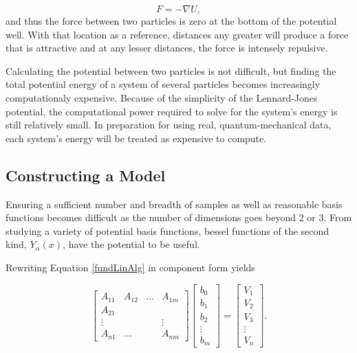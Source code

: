 \begin{equation} \label{forceEq}
F = -\nabla U,
\end{equation}
and thus the force between two particles is zero at the bottom of the potential well. With that location as a reference, distances any greater will produce a force that is attractive and at any lesser distances, the force is intensely repulsive.
\par Calculating the potential between two particles is not difficult, but finding the total potential energy of a system of several particles becomes increasingly computationaly expensive. Because of the simplicity of the Lennard-Jones potential, the computational power required to solve for the system's energy is still relatively small. In preparation for using real, quantum-mechanical data, each system's energy will be treated as expensive to compute. 



\subsection{Constructing a Model}\label{Sect:LJModels}
\par Ensuring a sufficient number and breadth of samples as well as reasonable basis functions becomes difficult as the number of dimensions goes beyond 2 or 3. From studying a variety of potential basis functions, bessel functions of the second kind, $Y_\alpha(x)$, have the potential to be useful.
\par Rewriting Equation \ref{fundLinAlg} in component form yields


\begin{equation}
\begin{bmatrix}
A_{11} & A_{12} & \ldots & A_{1m} \\
A_{21} \\
\vdots & & & \vdots\\
A_{n1} & \ldots & & A_{nm}
\end{bmatrix}
\begin{bmatrix}
b_0 \\
b_1 \\
b_2 \\
\vdots \\
b_m 
\end{bmatrix}
=
\begin{bmatrix}
V_1 \\
V_2 \\
V_3 \\ 
\vdots \\
V_n
\end{bmatrix}.
\label{AMatrix}
\end{equation}

